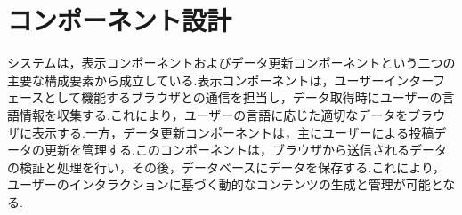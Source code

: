 \documentclass[b5paper,12pt,dvipdfmx]{jsreport}
\begin{document}
\section{コンポーネント設計}
システムは，表示コンポーネントおよびデータ更新コンポーネントという二つの主要な構成要素から成立している.表示コンポーネントは，ユーザーインターフェースとして機能するブラウザとの通信を担当し，データ取得時にユーザーの言語情報を収集する.これにより，ユーザーの言語に応じた適切なデータをブラウザに表示する.一方，データ更新コンポーネントは，主にユーザーによる投稿データの更新を管理する.このコンポーネントは，ブラウザから送信されるデータの検証と処理を行い，その後，データベースにデータを保存する.これにより，ユーザーのインタラクションに基づく動的なコンテンツの生成と管理が可能となる.



\end{document}
